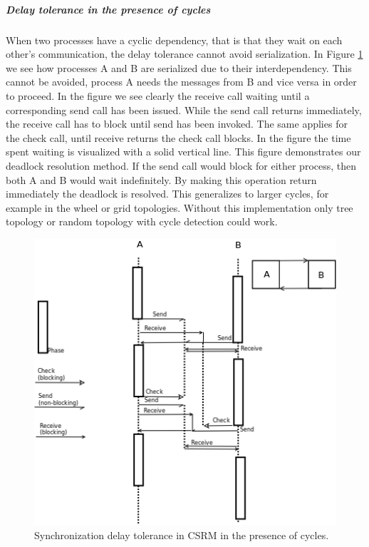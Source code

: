 \subparagraph{Delay tolerance in the presence of cycles}
When two processes have a cyclic dependency, that is that they wait on each other's communication, the delay tolerance cannot avoid serialization. In Figure \ref{fig:delaycyclic} we see how processes A and B are serialized due to their interdependency. This cannot be avoided, process A needs the messages from B and vice versa in order to proceed. In the figure we see clearly the receive call waiting until a corresponding send call has been issued. While the send call returns immediately, the receive call has to block until send has been invoked. The same applies for the check call, until receive returns the check call blocks. In the figure the time spent waiting is visualized with a solid vertical line. 
This figure demonstrates our deadlock resolution method. If the send call would block for either process, then both A and B would wait indefinitely. By making this operation return immediately the deadlock is resolved. This generalizes to larger cycles, for example in the wheel or grid topologies. Without this implementation only tree topology or random topology with cycle detection could work.
\begin{figure}
    \centering
    \includegraphics[width=\textwidth,height=\textheight,keepaspectratio]{figures/delaycycle.png}
    \caption{Synchronization delay tolerance in CSRM in the presence of cycles.}
    \label{fig:delaycyclic}
\end{figure}

